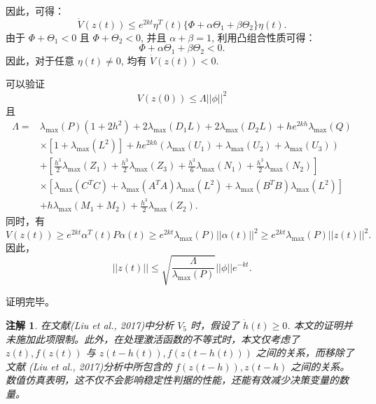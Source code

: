 \documentclass[a4paper, 12pt, oneside]{article}
\theoremstyle{cn_theorem}
\newtheorem{remark}{注解}[section]  %
\begin{document}
因此，可得：
\begin{equation*}
    \dot{V}(z(t)) \le e^{2kt} \eta^T(t) \{ \Phi + \alpha \Theta_1 + \beta \Theta_2 \} \eta(t).
\end{equation*}
由于 $\Phi + \Theta_1 < 0$ 且 $\Phi + \Theta_2 < 0$, 并且 $\alpha + \beta = 1$, 利用凸组合性质可得：
\begin{equation*}
    \Phi + \alpha \Theta_1 + \beta \Theta_2 < 0.
\end{equation*}
因此，对于任意 $\eta(t) \neq 0$, 均有 $\dot{V}(z(t)) < 0$.

可以验证
\begin{equation*}
    V(z(0)) \le \Lambda ||\phi||^2
\end{equation*}
且
\begin{align*}
    \Lambda =& \lambda_{\max}(P)(1+2h^2) + 2\lambda_{\max}(D_1 L) + 2\lambda_{\max}(D_2 L) + h e^{2kh} \lambda_{\max}(Q) \\
             & \times [1+\lambda_{\max}(L^2)] + h e^{2kh} (\lambda_{\max}(U_1) + \lambda_{\max}(U_2) + \lambda_{\max}(U_3)) \\
             & + \left[ \frac{h^3}{2}\lambda_{\max}(Z_1) + \frac{h^3}{2}\lambda_{\max}(Z_3) + \frac{h^3}{6}\lambda_{\max}(N_1) + \frac{h^3}{2}\lambda_{\max}(N_2) \right] \\
             & \times \left[ \lambda_{\max}(C^T C) + \lambda_{\max}(A^T A)\lambda_{\max}(L^2) + \lambda_{\max}(B^T B)\lambda_{\max}(L^2) \right] \\
             & + h \lambda_{\max}(M_1 + M_2) + \frac{h^3}{2}\lambda_{\max}(Z_2).
\end{align*}
同时，有
\begin{equation*}
    V(z(t)) \ge e^{2kt} \alpha^T(t) P \alpha(t) \ge e^{2kt} \lambda_{\max}(P)||\alpha(t)||^2 \ge e^{2kt} \lambda_{\max}(P)||z(t)||^2.
\end{equation*}
因此，
\begin{equation*}
    ||z(t)|| \le \sqrt{\frac{\Lambda}{\lambda_{\max}(P)}} ||\phi|| e^{-kt}.
\end{equation*}

证明完毕。

\begin{remark}
在文献(Liu et al., 2017)中分析 $V_5$ 时，假设了 $\dot{h}(t) \ge 0$. 本文的证明并未施加此项限制。此外，在处理激活函数的不等式时，本文仅考虑了 $z(t), f(z(t))$ 与 $z(t-h(t)), f(z(t-h(t)))$ 之间的关系，而移除了文献 (Liu et al., 2017)分析中所包含的 $f(z(t-h)), z(t-h)$ 之间的关系。数值仿真表明，这不仅不会影响稳定性判据的性能，还能有效减少决策变量的数量。
\end{remark}
\end{document}
